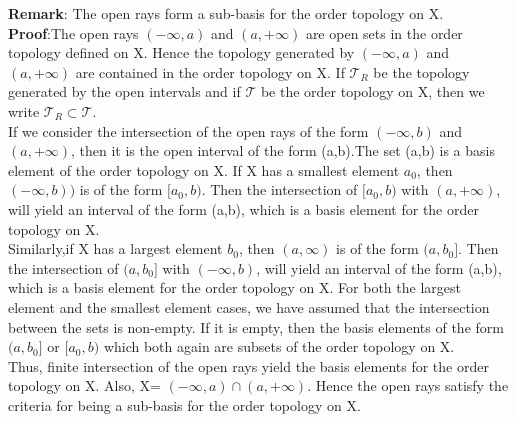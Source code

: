 \documentclass[a4paper,english,12pt]{article}
\begin{document}
\begin{flushleft}
{\bf Remark}: The open rays form a sub-basis for the order topology on X.\\
\vspace{2mm}
{\bf Proof}:The open rays $(-\infty,a)$ and $(a,+\infty)$ are open sets in the order topology defined on X. Hence the topology generated by $(-\infty,a)$ and $(a,+\infty)$ are contained in the order topology on X. If $\mathscr{T}_R$ be the topology generated by the open intervals and if $\mathscr{T}$ be the order topology on X, then we write $ \mathscr{T}_R\subset \mathscr{T}$. \\
\vspace{1mm}
If we consider the intersection of the open rays of the form $(-\infty,b)$ and $(a,+\infty)$, then it is the open interval of the form (a,b).The set (a,b) is a basis element of the order topology on X. If X has a smallest element $a_0$, then $(-\infty,b))$ is of the form $[a_0,b)$. Then the intersection of $[a_0,b)$ with $(a,+\infty)$, will yield an interval of the form (a,b), which is a basis element for the order topology on X. \\
\vspace{1mm}
Similarly,if X has a largest element $b_0$, then $(a,\infty)$ is of the form $(a,b_0]$. Then the intersection of $(a,b_0]$ with $(-\infty,b)$, will yield an interval of the form (a,b), which is a basis element for the order topology on X. For both the largest element and the smallest element cases, we have assumed that the intersection between the sets is non-empty. If it is empty, then the basis elements of the form $(a,b_0]$ or $[a_0,b)$ which both again are subsets of the order topology on X.\\
Thus, finite intersection of the open rays yield the basis elements for the order topology on X. Also, X= $(-\infty,a) \cap (a,+\infty)$. Hence the open rays satisfy the criteria for being a sub-basis for the order topology on X.
\vspace{3mm}


\end{flushleft}
\end{document}
